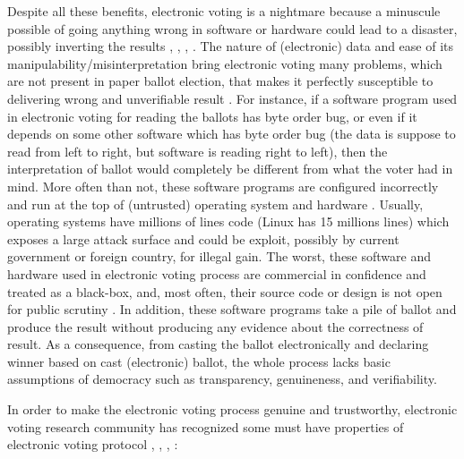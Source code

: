    
  Despite all these benefits, electronic voting is a nightmare because a minuscule possible of 
  going anything wrong in software or hardware could lead to a disaster,   possibly 
  inverting the results \citep{TSwiss},
  \citep{10.1007/978-3-319-22270-7_3}, \citep{ARANHA2019335},
  \citep{Feldman:2007:SAD:1323111.1323113}.  The nature of (electronic) data and ease of 
  its manipulability/misinterpretation bring electronic voting many problems, which are not present in paper ballot election, that 
  makes it perfectly susceptible to delivering wrong and unverifiable result \citep{Wolchok:2010:SAI:1866307.1866309}.
  For instance,  if a software program used in electronic voting 
  for reading the ballots has byte order bug, or even if it depends on some other software which has byte order bug (the data is suppose to read 
  from left to right, but software is reading right to left), then the interpretation of 
  ballot would completely be different from what the voter had in mind.
  More often than not, these software programs are configured incorrectly and run at the top of (untrusted) operating 
  system and hardware \citep{1301313}. Usually, operating systems have millions of lines code (Linux has 15 millions lines) which exposes
  a large attack surface and could be exploit, possibly by current government or foreign country, for illegal gain.
  The worst, these software and hardware used in electronic voting process are commercial in 
  confidence and treated as a black-box, and, most often, their source code or design is not open 
  for public scrutiny \citep{AEC:2013:LMM}. In addition, these software programs 
  take a pile of ballot and produce the result without producing any evidence about the correctness of result.  As a consequence,
  from casting the ballot electronically and declaring winner based on cast (electronic) ballot, the whole process lacks basic assumptions
  of democracy such as transparency, genuineness, and verifiability. 
  
  In order to make the electronic voting process genuine and trustworthy, electronic voting 
  research community has recognized some must have properties of electronic voting protocol
  \citep{5958051}, 
   \citep{Benaloh:1994:RSE:195058.195407},  \citep{Delaune:2010:VPT}, \citep{Bernhard:2017:PES}:
  

